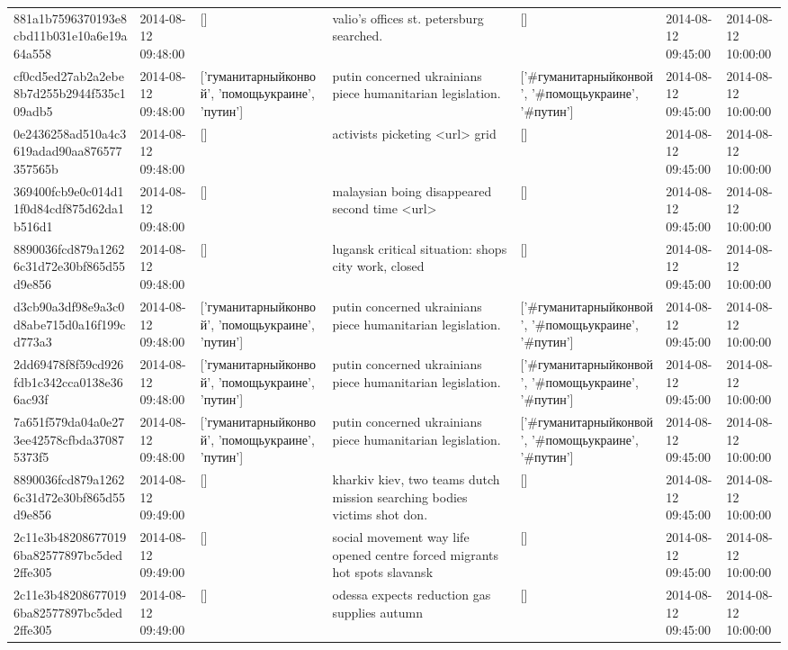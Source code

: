 \begin{tabular}{lllllll}
881a1b7596370193e8cbd11b031e10a6e19a64a558 & 2014-08-12 09:48:00 & [] & valio's offices st. petersburg searched. & [] & 2014-08-12 09:45:00 & 2014-08-12 10:00:00 \\
cf0cd5ed27ab2a2ebe8b7d255b2944f535c109adb5 & 2014-08-12 09:48:00 & ['гуманитарныйконвой', 'помощьукраине', 'путин'] & putin concerned ukrainians piece humanitarian legislation. & ['#гуманитарныйконвой', '#помощьукраине', '#путин'] & 2014-08-12 09:45:00 & 2014-08-12 10:00:00 \\
0e2436258ad510a4c3619adad90aa876577357565b & 2014-08-12 09:48:00 & [] & activists picketing <url> grid & [] & 2014-08-12 09:45:00 & 2014-08-12 10:00:00 \\
369400fcb9e0c014d11f0d84cdf875d62da1b516d1 & 2014-08-12 09:48:00 & [] & malaysian boing disappeared second time <url> & [] & 2014-08-12 09:45:00 & 2014-08-12 10:00:00 \\
8890036fcd879a12626c31d72e30bf865d55d9e856 & 2014-08-12 09:48:00 & [] & lugansk critical situation: shops city work, closed & [] & 2014-08-12 09:45:00 & 2014-08-12 10:00:00 \\
d3cb90a3df98e9a3c0d8abe715d0a16f199cd773a3 & 2014-08-12 09:48:00 & ['гуманитарныйконвой', 'помощьукраине', 'путин'] & putin concerned ukrainians piece humanitarian legislation. & ['#гуманитарныйконвой', '#помощьукраине', '#путин'] & 2014-08-12 09:45:00 & 2014-08-12 10:00:00 \\
2dd69478f8f59cd926fdb1c342cca0138e366ac93f & 2014-08-12 09:48:00 & ['гуманитарныйконвой', 'помощьукраине', 'путин'] & putin concerned ukrainians piece humanitarian legislation. & ['#гуманитарныйконвой', '#помощьукраине', '#путин'] & 2014-08-12 09:45:00 & 2014-08-12 10:00:00 \\
7a651f579da04a0e273ee42578cfbda370875373f5 & 2014-08-12 09:48:00 & ['гуманитарныйконвой', 'помощьукраине', 'путин'] & putin concerned ukrainians piece humanitarian legislation. & ['#гуманитарныйконвой', '#помощьукраине', '#путин'] & 2014-08-12 09:45:00 & 2014-08-12 10:00:00 \\
8890036fcd879a12626c31d72e30bf865d55d9e856 & 2014-08-12 09:49:00 & [] & kharkiv kiev, two teams dutch mission searching bodies victims shot don. & [] & 2014-08-12 09:45:00 & 2014-08-12 10:00:00 \\
2c11e3b482086770196ba82577897bc5ded2ffe305 & 2014-08-12 09:49:00 & [] & social movement way life opened centre forced migrants hot spots slavansk & [] & 2014-08-12 09:45:00 & 2014-08-12 10:00:00 \\
2c11e3b482086770196ba82577897bc5ded2ffe305 & 2014-08-12 09:49:00 & [] & odessa expects reduction gas supplies autumn & [] & 2014-08-12 09:45:00 & 2014-08-12 10:00:00 \\

\end{tabular}
